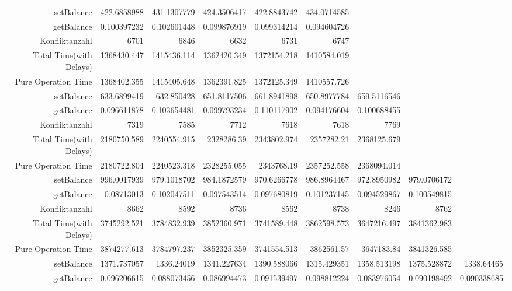 \begin{landscape}
\begin{table}[htbp]
\begin{tabular}{rrrrrrrrr}
\cline{1-9}      
    setBalance & 422.6858988 & 431.1307779 & 424.3506417 & 422.8843742 & 434.0714585 &       &       &  \\
    getBalance & 0.100397232 & 0.102601448 & 0.099876919 & 0.099314214 & 0.094604726 &       &       &  \\
    Konfliktanzahl & 6701  & 6846  & 6632  & 6731  & 6747  &       &       &  \\
    Total Time(with Delays) & 1368430.447 & 1415436.114 & 1362420.349 & 1372154.218 & 1410584.019 &       &       &  \\
    Pure Operation Time & 1368402.355 & 1415405.648 & 1362391.825 & 1372125.349 & 1410557.726 &       &       &  \\
\cline{1-9}      
    setBalance & 633.6899419 & 632.850428 & 651.8117506 & 661.8941898 & 650.8977784 & 659.5116546 &       &  \\
    getBalance & 0.096611878 & 0.103654481 & 0.099793234 & 0.110117902 & 0.094176604 & 0.100688455 &       &  \\
    Konfliktanzahl & 7319  & 7585  & 7712  & 7618  & 7618  & 7769  &       &  \\
    Total Time(with Delays) & 2180750.589 & 2240554.915 & 2328286.39 & 2343802.974 & 2357282.21 & 2368125.679 &       &  \\
    Pure Operation Time & 2180722.804 & 2240523.318 & 2328255.055 & 2343768.19 & 2357252.558 & 2368094.014 &       &  \\
\cline{1-9}      
    setBalance & 996.0017939 & 979.1018702 & 984.1872579 & 970.6266778 & 986.8964467 & 972.8950982 & 979.0706172 &  \\
    getBalance & 0.08713013 & 0.102047511 & 0.097543514 & 0.097680819 & 0.101237145 & 0.094529867 & 0.100549815 &  \\
    Konfliktanzahl & 8662  & 8592  & 8736  & 8562  & 8738  & 8246  & 8762  &  \\
    Total Time(with Delays) & 3745292.521 & 3784832.939 & 3852360.971 & 3741589.448 & 3862598.573 & 3647216.497 & 3841362.983 &  \\
    Pure Operation Time & 3874277.613 & 3784797.237 & 3852325.359 & 3741554.513 & 3862561.57 & 3647183.84 & 3841326.585 &  \\
\cline{1-9}      
    setBalance & 1371.737057 & 1336.24019 & 1341.227634 & 1390.588066 & 1315.429351 & 1358.513198 & 1375.528872 & 1338.64465 \\
    getBalance & 0.096206615 & 0.088073456 & 0.086994473 & 0.091539497 & 0.098812224 & 0.083976054 & 0.090198492 & 0.090338685 \\

\end{tabular}
\end{table}
\end{landscape}
